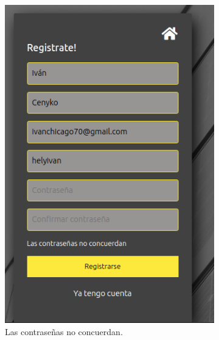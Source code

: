 \begin{itemize}
\begin{figure}[H]
\begin{subfigure}{0.5\textwidth}
\includegraphics[width=0.9\linewidth]{web/Captura desde 2023-10-15 23-23-00.png} 
\caption{Las contraseñas no concuerdan.}
\label{fig:subim1}
\end{subfigure}
\begin{subfigure}{0.5\textwidth}

\end{subfigure}
\end{figure}
\end{itemize}
